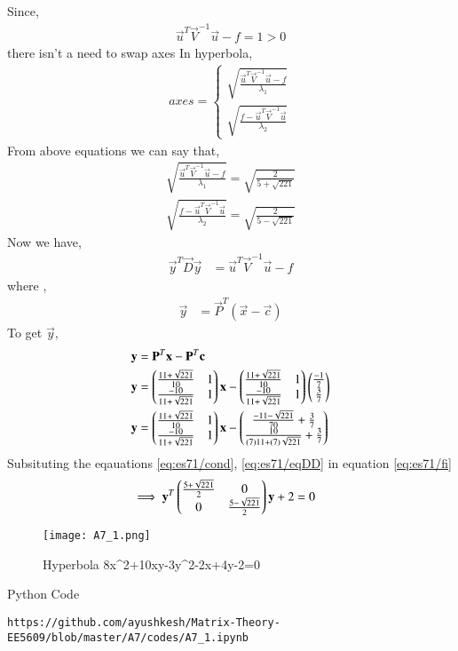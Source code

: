 \documentclass[journal,12pt,twocolumn]{IEEEtran}
\begin{document}
Since,
\begin{align}
    \vec{u}^T\vec{V}^{-1}\vec{u}-f = 1 > 0\label{eq:es71/cond}
\end{align} 
there isn't a need to swap axes
In hyperbola,
\begin{align}
axes=
\begin{cases}
\sqrt{\frac{\vec{u}^T\vec{V}^{-1}\vec{u}-f}{\lambda_1}}\\ \sqrt{\frac{f-\vec{u}^T\vec{V}^{-1}\vec{u}}{\lambda_2}}
\end{cases}
\end{align}
From above equations we can say that,
\begin{align}
\sqrt{\frac{\vec{u}^T\vec{V}^{-1}\vec{u}-f}{\lambda_1}}=\sqrt{ \frac{2}{5+\sqrt{221}}}\\
\sqrt{\frac{f-\vec{u}^T\vec{V}^{-1}\vec{u}}{\lambda_2}}=\sqrt{ \frac{2}{5-\sqrt{221}}}
\end{align}
Now we have,
\begin{align}
    \vec{y}^T\vec{D}\vec{y}&=\vec{u}^T\vec{V}^{-1}\vec{u}-f\label{eq:es71/fi}
\end{align}
where ,
\begin{align}
    \vec{y}&=\vec{P}^T(\vec{x}-\vec{c})
\end{align}
To get $\vec{y}$,
\begin{align}
\mathbf{y}&=\mathbf{P}^T\mathbf{x}-\mathbf{P}^T\mathbf{c}\\
    \mathbf{y}&= \begin{pmatrix}\frac{11+\sqrt{221}}{10} & 1 \\ \frac{-10}{11+\sqrt{221}} & 1\end{pmatrix}\mathbf{x}-\begin{pmatrix}\frac{11+\sqrt{221}}{10} & 1 \\ \frac{-10}{11+\sqrt{221}} & 1\end{pmatrix}\begin{pmatrix}\frac{-1}{7}\\\frac{3}{7}\end{pmatrix}\\
    \mathbf{y}&=\begin{pmatrix}\frac{11+\sqrt{221}}{10} & 1 \\ \frac{-10}{11+\sqrt{221}} & 1\end{pmatrix}\mathbf{x}-\begin{pmatrix}\frac{-11-\sqrt{221}}{70}+\frac{3}{7} \\ \frac{10}{(7)11+(7)\sqrt{221}}+\frac{3}{7}\end{pmatrix}
\end{align}
Subsituting the eqauations \eqref{eq:es71/cond}, \eqref{eq:es71/eqDD} in equation \eqref{eq:es71/fi}
\begin{align}
   \implies\mathbf{y}^T\begin{pmatrix}\frac{5+\sqrt{221}}{2} & 0 \\0 & \frac{5-\sqrt{221}}{2}\end{pmatrix}\mathbf{y}+2&=0
\end{align}
\renewcommand{\thefigure}{1}
\begin{figure}[h]
    \centering
    \texttt{[image: A7\_1.png]}
    \caption{Hyperbola 8x^2+10xy-3y^2-2x+4y-2=0}
    \label{Fig:1}
\end{figure}
Python Code 
\begin{lstlisting}
https://github.com/ayushkesh/Matrix-Theory-EE5609/blob/master/A7/codes/A7_1.ipynb
\end{lstlisting}
\end{document}
